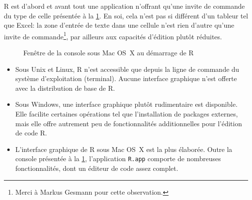 R est d'abord et avant tout une application n'offrant qu'une invite de
commande du type de celle présentée à la
\ref{fig:presentation:console}. En soi, cela n'est pas si différent
d'un tableur tel que Excel: la zone d'entrée de texte dans une cellule
n'est rien d'autre qu'une invite de commande\footnote{%
  Merci à Markus Gesmann pour cette observation.}, par ailleurs aux
capacités d'édition plutôt réduites.

\begin{figure}
  \centering
  \caption{Fenêtre de la console sous Mac OS~X au démarrage de R}
  \label{fig:presentation:console}
\end{figure}

\begin{itemize}
\item Sous Unix et Linux, R n'est accessible que depuis la ligne de
  commande du système d'exploitation (terminal). Aucune interface
  graphique n'est offerte avec la distribution de base de R.
\item Sous Windows, une interface graphique plutôt rudimentaire est
  disponible. Elle facilite certaines opérations tel que
  l'installation de packages externes, mais elle offre autrement peu
  de fonctionnalités additionnelles pour l'édition de code R.
\item L'interface graphique de R sous Mac OS~X est la plus élaborée.
  Outre la console présentée à la
  \ref{fig:presentation:console}, l'application \texttt{R.app}
  comporte de nombreuses fonctionnalités, dont un éditeur de code
  assez complet.
\end{itemize}
